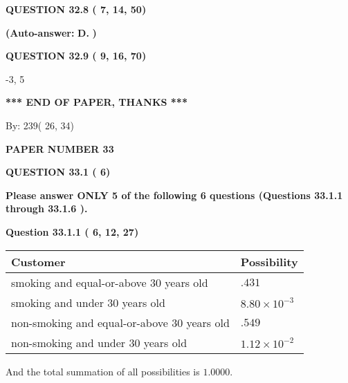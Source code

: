 \documentclass[12pt]{article}
\begin{document}
  
  
{\textbf{\large{QUESTION
32.8 
 (          7,         14,         50)
}}}
 
 
{\textbf{(Auto-answer:}}
{\textbf{\large{
D.}}}
{\textbf{)}}
 
 
  
  
{\textbf{\large{QUESTION
32.9 
 (          9,         16,         70)
}}}

-3,  %
5
 
   
   
   
   
\vspace{1.0in} 
{\textbf{\large{ *** END OF PAPER, THANKS *** }}} 
   
   
\hspace{1.0in} By: 
         239(         26,          34)
   
   
   
   
\newpage 
\setcounter{page}{ 
    33001 } 
   
   
 {\textbf{ \Large{ PAPER NUMBER          33 }}}
   
   
   
   
  
\vspace{0.2in}
  
{\textbf{\Large{QUESTION
33.1 
 (          6)
}}}
  
  
{\textbf{\Large{Please answer ONLY  %
           5 %
 of the following  %
           6 %
 questions (Questions  %
33.1.1 %
 through  %
33.1.6 %
 ). }}}
   
   
  
  
{\textbf{\large{Question
33.1.1 
 (          6,         12,         27)
}}}

 
\noindent
\begin{tabular}{|l|l|}
\hline
Customer & Possibility \\
\hline
smoking  and  %
equal-or-above 30 years old &
  $ %
.431$ \\
\hline
smoking  and  %
under 30 years old &
  $ %
8.80 \times 10^{-3}$ \\
\hline
 non-smoking and  %
equal-or-above 30 years old &
  $ %
.549$ \\
\hline
 non-smoking and  %
under 30 years old &
  $ %
1.12 \times 10^{-2}$ \\
\hline
\end{tabular}
 
\noindent
 And the total summation of all possibilities is $  %
1.0000 $.
 
  
  
\end{document}
